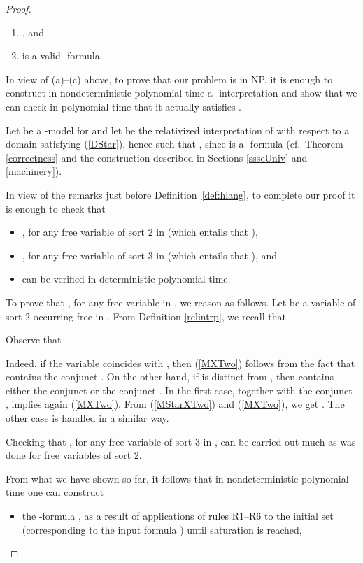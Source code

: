 \documentclass{fundam}
\begin{document}
\begin{proof}
\begin{enumerate}[~~~~(a)]
\item , and

\item  is a valid -formula.
\end{enumerate}
In view of (a)--(c) above, to prove that our problem is in
\textsf{NP}, it is enough to construct in nondeterministic polynomial
time a -interpretation and show that we can check in polynomial
time that it actually satisfies .

Let  be a -model for  and let  be the relativized interpretation of  with respect
to a domain  satisfying (\ref{DStar}), hence such that
, since  is a
-formula (cf.\ Theorem \ref{correctness} and the
construction described in Sections \ref{ssseUniv} and \ref{machinery}).

In view of the remarks just before Definition~\ref{def:hlang}, to
complete our proof it is enough to check that
\begin{itemize}
\item , for any free variable 
of sort 2 in  (which entails that ),

\item , for any free
variable  of sort 3 in  (which entails that ), and

\item  can be verified in deterministic
polynomial time.
\end{itemize}

To prove that , for any free
variable  in , we reason as follows.  Let  be a
variable of sort 2 occurring free in .  From Definition
\ref{relintrp}, we recall that


Observe that

Indeed, if the variable  coincides with , then
(\ref{MXTwo}) follows from the fact that  contains the conjunct
.  On the other hand, if  is distinct from , then  contains either the conjunct  or the conjunct . In the first case,
 together with the conjunct
, implies again (\ref{MXTwo}).
From (\ref{MStarXTwo}) and (\ref{MXTwo}), we get . The other case is handled in a similar way.

Checking that , for any
free variable  of sort 3 in , can be carried out much as
was done for free variables of sort 2.

From what we have shown so far, it follows that
in nondeterministic polynomial time one can construct
\begin{itemize}
    \item the -formula , as a result of
    applications of rules R1--R6 to the initial set 
    (corresponding to the input formula ) until saturation is
    reached,


\end{itemize}
\end{proof}
\end{document}
